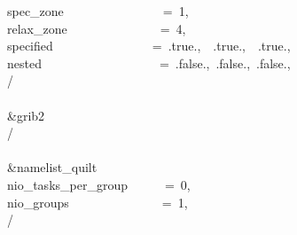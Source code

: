 spec\_zone~~~~~~~~~~~~~~~~=~1,\\
relax\_zone~~~~~~~~~~~~~~~=~4,\\
specified~~~~~~~~~~~~~~~~=~.true.,~~.true.,~~.true.,~~\\
nested~~~~~~~~~~~~~~~~~~~=~.false.,~.false.,~.false.,~~\\
/\\
\\
\&grib2~~~~~~~~~~~~~~~~~~~\\
/\\
\\
\&namelist\_quilt~~~~~~~~~~\\
nio\_tasks\_per\_group~~~~~~=~0,\\
nio\_groups~~~~~~~~~~~~~~~=~1,\\
/\\

